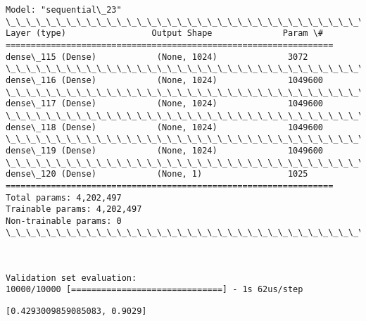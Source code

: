 \documentclass[11pt]{article}
\makeatletter
\newcommand{\boxspacing}{\kern\kvtcb@left@rule\kern\kvtcb@boxsep}
\newcommand{\prompt}[4]{
        \ttfamily\llap{{\color{#2}[#3]:\hspace{3pt}#4}}\vspace{-\baselineskip}
    }
\makeatother
\begin{document}
    \begin{Verbatim}[commandchars=\\\{\}]
Model: "sequential\_23"
\_\_\_\_\_\_\_\_\_\_\_\_\_\_\_\_\_\_\_\_\_\_\_\_\_\_\_\_\_\_\_\_\_\_\_\_\_\_\_\_\_\_\_\_\_\_\_\_\_\_\_\_\_\_\_\_\_\_\_\_\_\_\_\_\_
Layer (type)                 Output Shape              Param \#
=================================================================
dense\_115 (Dense)            (None, 1024)              3072
\_\_\_\_\_\_\_\_\_\_\_\_\_\_\_\_\_\_\_\_\_\_\_\_\_\_\_\_\_\_\_\_\_\_\_\_\_\_\_\_\_\_\_\_\_\_\_\_\_\_\_\_\_\_\_\_\_\_\_\_\_\_\_\_\_
dense\_116 (Dense)            (None, 1024)              1049600
\_\_\_\_\_\_\_\_\_\_\_\_\_\_\_\_\_\_\_\_\_\_\_\_\_\_\_\_\_\_\_\_\_\_\_\_\_\_\_\_\_\_\_\_\_\_\_\_\_\_\_\_\_\_\_\_\_\_\_\_\_\_\_\_\_
dense\_117 (Dense)            (None, 1024)              1049600
\_\_\_\_\_\_\_\_\_\_\_\_\_\_\_\_\_\_\_\_\_\_\_\_\_\_\_\_\_\_\_\_\_\_\_\_\_\_\_\_\_\_\_\_\_\_\_\_\_\_\_\_\_\_\_\_\_\_\_\_\_\_\_\_\_
dense\_118 (Dense)            (None, 1024)              1049600
\_\_\_\_\_\_\_\_\_\_\_\_\_\_\_\_\_\_\_\_\_\_\_\_\_\_\_\_\_\_\_\_\_\_\_\_\_\_\_\_\_\_\_\_\_\_\_\_\_\_\_\_\_\_\_\_\_\_\_\_\_\_\_\_\_
dense\_119 (Dense)            (None, 1024)              1049600
\_\_\_\_\_\_\_\_\_\_\_\_\_\_\_\_\_\_\_\_\_\_\_\_\_\_\_\_\_\_\_\_\_\_\_\_\_\_\_\_\_\_\_\_\_\_\_\_\_\_\_\_\_\_\_\_\_\_\_\_\_\_\_\_\_
dense\_120 (Dense)            (None, 1)                 1025
=================================================================
Total params: 4,202,497
Trainable params: 4,202,497
Non-trainable params: 0
\_\_\_\_\_\_\_\_\_\_\_\_\_\_\_\_\_\_\_\_\_\_\_\_\_\_\_\_\_\_\_\_\_\_\_\_\_\_\_\_\_\_\_\_\_\_\_\_\_\_\_\_\_\_\_\_\_\_\_\_\_\_\_\_\_
    \end{Verbatim}

    \begin{center}
    \end{center}
    { \hspace*{\fill} \\}
    
    \begin{Verbatim}[commandchars=\\\{\}]
Validation set evaluation:
10000/10000 [==============================] - 1s 62us/step
    \end{Verbatim}

            \begin{tcolorbox}[breakable, size=fbox, boxrule=.5pt, pad at break*=1mm, opacityfill=0]
\prompt{Out}{outcolor}{64}{\boxspacing}
\begin{Verbatim}[commandchars=\\\{\}]
[0.4293009859085083, 0.9029]
\end{Verbatim}
\end{tcolorbox}
        

    
    
    
\end{document}

